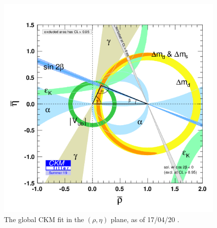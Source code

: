 \documentclass[a4paper,12pt]{article}
\begin{document}
\begin{figure}[H]
    \centering
    \includegraphics[scale=0.4,trim=0 20pt 0 50pt,clip]{rhoeta_large.png}
    \caption{\label{fig:ckmfitter} The global CKM fit in the $(\rho,\eta)$ plane, as of 17/04/20 \cite{ckm}.}
\end{figure}
\end{document}
